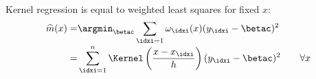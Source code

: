 \begin{propositionbox}\nospacing
    \begin{proposition}\label{proposition:kernel_regression_is_weighted_least_squars}\leavevmode\\
        Kernel regression is equal to weighted least squares for fixed $x$:
        \begin{align}
          \widehat{m}(x)=&\argmin_{\betac}\sum_{\idxi=1}\omega_{\idxi}(x)(y_{\idxi}-\betac)^{2}\nonumber\\[-1\jot]
          =&\sum_{\idxi=1}^{n}\Kernel \left(\frac{x-x_{\idxi}}{h}\right)(y_{\idxi}-\betac)^{2}\qquad\forall x
        \end{align}
    \end{proposition}
\end{propositionbox}
